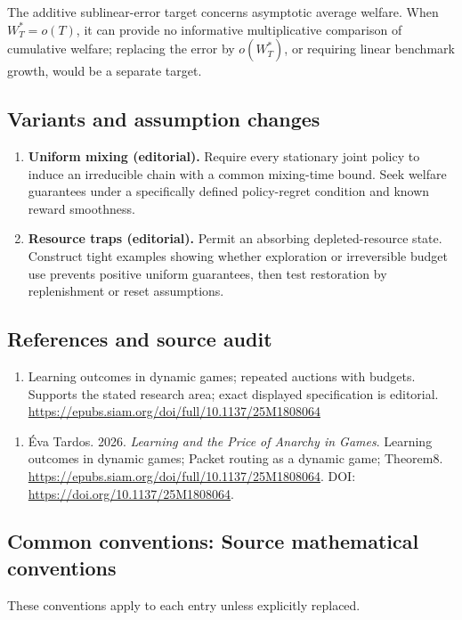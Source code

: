 \documentclass[11pt,a4paper]{article}
\begin{document}
The additive sublinear-error target concerns asymptotic average welfare. When \(W_T^*=o(T)\), it can provide no informative multiplicative comparison of cumulative welfare; replacing the error by \(o(W_T^*)\), or requiring linear benchmark growth, would be a separate target.
\subsection*{Variants and assumption changes}
\begin{enumerate}
\item \textbf{Uniform mixing (editorial).} Require every stationary joint policy to induce an irreducible chain with a common mixing-time bound. Seek welfare guarantees under a specifically defined policy-regret condition and known reward smoothness.
\item \textbf{Resource traps (editorial).} Permit an absorbing depleted-resource state. Construct tight examples showing whether exploration or irreversible budget use prevents positive uniform guarantees, then test restoration by replenishment or reset assumptions.
\end{enumerate}
\subsection*{References and source audit}
\begin{enumerate}
\item Learning outcomes in dynamic games; repeated auctions with budgets. Supports the stated research area; exact displayed specification is editorial. \url{https://epubs.siam.org/doi/full/10.1137/25M1808064}
\end{enumerate}
\begin{enumerate}\raggedright
\item\hypertarget{definitions:source:30007567:1}{} Éva Tardos. 2026. \emph{Learning and the Price of Anarchy in Games}. Learning outcomes in dynamic games; Packet routing as a dynamic game; Theorem8.
\url{https://epubs.siam.org/doi/full/10.1137/25M1808064}.
DOI: \url{https://doi.org/10.1137/25M1808064}.
\end{enumerate}

\subsection*{Common conventions: Source mathematical conventions}

These conventions apply to each entry unless explicitly replaced.
\end{document}
